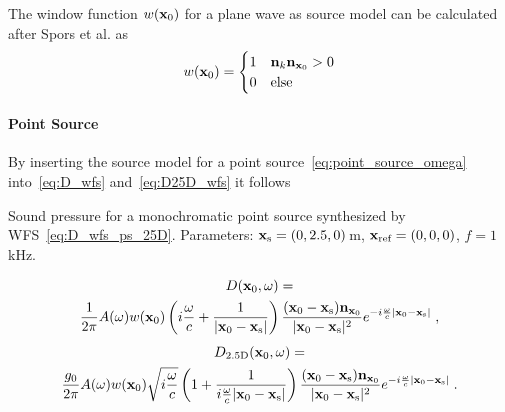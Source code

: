 The window function $w(\mathbf{x}_0)$ for a plane wave as source model can be
calculated after Spors et al. as\autocite{Spors2008}
%
\begin{equation}
    w(\x_0) = 
    \begin{cases}
        1 & \n_k \n_{\x_0} > 0 \\
        0 & \text{else}
    \end{cases}
    \label{eq:w_pw}
\end{equation}
%



\paragraph{Point Source}
%
%
By inserting the source model for a point
source~\eqref{eq:point_source_omega}
into~\eqref{eq:D_wfs} and~\eqref{eq:D25D_wfs} it follows
%
\begin{marginfigure}
    \centering
    \ft
    
    \caption{Sound pressure for a monochromatic point source synthesized by
        \twohalfD \ac{WFS}~\eqref{eq:D_wfs_ps_25D}. Parameters: $\mathbf{x}_\text{s} = (0,2.5,0)$\,m,
        $\mathbf{x}_\text{ref} = (0,0,0)$, $f = 1$\,kHz.
        }
\end{marginfigure}
%
\begin{multline}
    D(\x_0,\omega) = \\
    \frac{1}{2\pi} A(\omega) w(\x_0) \left(i\omegac +
    \frac{1}{|\x_0-\xs|} \right) \frac{(\x_0-\xs)\n_{\x_0}}{|\x_0-\xs|^2}
    e^{-i\omegac |\x_0-\xs|} \qc
    \label{eq:D_wfs_ps_without_approximation}
\end{multline}
%
\begin{multline}
    D_\twohalfD(\x_0,\omega) = \\
    \frac{g_0}{2\pi} A(\omega) w(\x_0) \sqrt{i\omegac} \left(
    1 + \frac{1}{i\omegac|\x_0-\xs|}
    \right) \frac{(\x_0-\xs) \n_{\x_0}}{|\x_0-\xs|^2} e^{-i\omegac |\x_0-\xs|} \qp
    \label{eq:D_wfs_ps_25D_without_approximation}
\end{multline}

